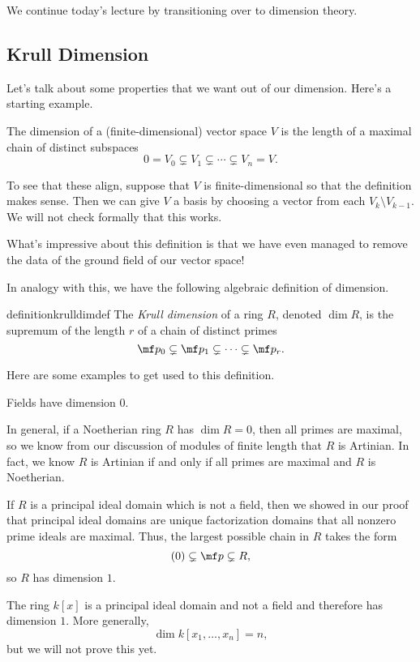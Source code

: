 
We continue today's lecture by transitioning over to dimension theory.

\subsection{Krull Dimension}
Let's talk about some properties that we want out of our dimension. Here's a starting example.
\begin{defi}
	The dimension of a (finite-dimensional) vector space $V$ is the length of a maximal chain of distinct subspaces
	\[0=V_0\subsetneq V_1\subsetneq\cdots\subsetneq V_n=V.\]
\end{defi}
\begin{remark}
	To see that these align, suppose that $V$ is finite-dimensional so that the definition makes sense. Then we can give $V$ a basis by choosing a vector from each $V_k\setminus V_{k-1}$. We will not check formally that this works.
\end{remark}
What's impressive about this definition is that we have even managed to remove the data of the ground field of our vector space!

In analogy with this, we have the following algebraic definition of dimension.
\begin{restatable}{definition}{krulldimdef} \label{def:krulldim}
	The \textit{Krull dimension} of a ring $R$, denoted $\dim R$, is the supremum of the length $r$ of a chain of distinct primes
	\[\mf p_0\subsetneq\mf p_1\subsetneq\cdots\subsetneq\mf p_r.\]
\end{restatable}
Here are some examples to get used to this definition.
\begin{example}
	Fields have dimension $0$.
\end{example}
\begin{example}
	In general, if a Noetherian ring $R$ has $\dim R=0$, then all primes are maximal, so we know from our discussion of modules of finite length that $R$ is Artinian. In fact, we know $R$ is Artinian if and only if all primes are maximal and $R$ is Noetherian.
\end{example}
\begin{example}
	If $R$ is a principal ideal domain which is not a field, then we showed in our proof that principal ideal domains are unique factorization domains that all nonzero prime ideals are maximal. Thus, the largest possible chain in $R$ takes the form
	\[(0)\subsetneq\mf p\subsetneq R,\]
	so $R$ has dimension $1$.
\end{example}
\begin{example}
	The ring $k[x]$ is a principal ideal domain and not a field and therefore has dimension $1$. More generally,
	\[\dim k[x_1,\ldots,x_n]=n,\]
	but we will not prove this yet.
\end{example}

